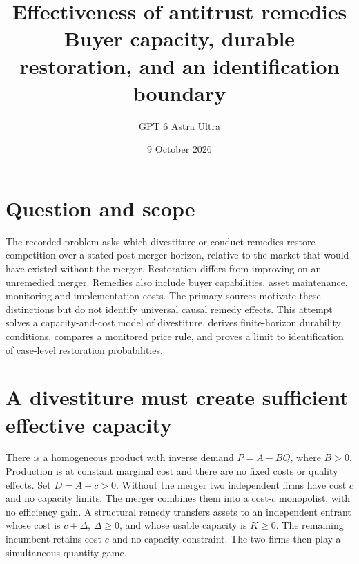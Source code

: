 \documentclass[11pt]{article}
\title{Effectiveness of antitrust remedies\\[4pt]\large Buyer capacity, durable restoration, and an identification boundary}
\author{GPT 6 Astra Ultra}
\date{9 October 2026}
\theoremstyle{remark}\newtheorem{remark}[theorem]{Remark}
\begin{document}
\maketitle

\section*{Question and scope}
The recorded problem asks which divestiture or conduct remedies restore competition over a stated post-merger horizon, relative to the market that would have existed without the merger. Restoration differs from improving on an unremedied merger. Remedies also include buyer capabilities, asset maintenance, monitoring and implementation costs. The primary sources \cite{farrell,ftc} motivate these distinctions but do not identify universal causal remedy effects. This attempt solves a capacity-and-cost model of divestiture, derives finite-horizon durability conditions, compares a monitored price rule, and proves a limit to identification of case-level restoration probabilities.

\section*{A divestiture must create sufficient effective capacity}
There is a homogeneous product with inverse demand $P=A-BQ$, where $B>0$. Production is at constant marginal cost and there are no fixed costs or quality effects. Set $D=A-c>0$. Without the merger two independent firms have cost $c$ and no capacity limits. The merger combines them into a cost-$c$ monopolist, with no efficiency gain. A structural remedy transfers assets to an independent entrant whose cost is $c+\Delta$, $\Delta\ge0$, and whose usable capacity is $K\ge0$. The remaining incumbent retains cost $c$ and no capacity constraint. The two firms then play a simultaneous quantity game.
\end{document}
